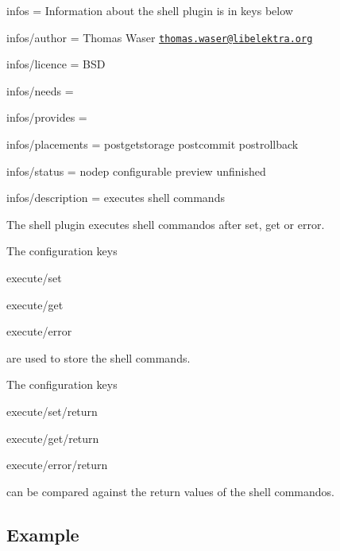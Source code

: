 
\begin{DoxyItemize}
\item infos = Information about the shell plugin is in keys below
\item infos/author = Thomas Waser \href{mailto:thomas.waser@libelektra.org}{\tt thomas.\+waser@libelektra.\+org}
\item infos/licence = B\+SD
\item infos/needs =
\item infos/provides =
\item infos/placements = postgetstorage postcommit postrollback
\item infos/status = nodep configurable preview unfinished
\item infos/description = executes shell commands
\end{DoxyItemize}

The shell plugin executes shell commandos after set, get or error.

The configuration keys


\begin{DoxyItemize}
\item {\ttfamily execute/set}
\item {\ttfamily execute/get}
\item {\ttfamily execute/error}
\end{DoxyItemize}

are used to store the shell commands.

The configuration keys


\begin{DoxyItemize}
\item {\ttfamily execute/set/return}
\item {\ttfamily execute/get/return}
\item {\ttfamily execute/error/return}
\end{DoxyItemize}

can be compared against the return values of the shell commandos.

\subsection*{Example}


 